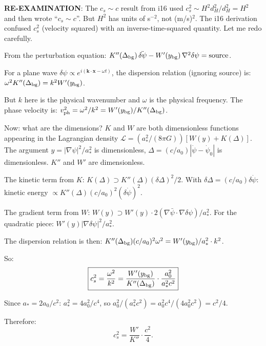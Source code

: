 \documentclass[11pt]{article}
\begin{document}
\begin{tcolorbox}[colback=red!5!white, colframe=red!70!black,
  title=\textbf{W4i17 TOP 5 FINDINGS --- EXISTENTIAL AUDIT: DUST BRANCH CLUSTERING}]
\begin{enumerate}
  \textbf{RE-EXAMINATION}: The $c_s \sim c$ result from i16
  used $c_s^2 \sim H^2 d_H^2 / d_H^2 = H^2$ and then wrote
  ``$c_s \sim c$''. But $H^2$ has units of s$^{-2}$, not
  (m/s)$^2$. The i16 derivation confused $c_s^2$ (velocity squared)
  with an inverse-time-squared quantity. Let me redo carefully.

  From the perturbation equation:
  $K''(\Delta_{\rm bg})\,\ddot{\delta\psi}
  - W'(y_{\rm bg})\,\nabla^2\delta\psi = \text{source}$.

  For a plane wave $\delta\psi \propto e^{i(\mathbf{k}\cdot\mathbf{x}
  - \omega t)}$, the dispersion relation (ignoring source) is:
  $\omega^2 K''(\Delta_{\rm bg}) = k^2 W'(y_{\rm bg})$.

  But $k$ here is the physical wavenumber and $\omega$ is the physical
  frequency. The phase velocity is:
  $v_{\rm ph}^2 = \omega^2/k^2 = W'(y_{\rm bg})/K''(\Delta_{\rm bg})$.

  Now: what are the dimensions? $K$ and $W$ are both dimensionless
  functions appearing in the Lagrangian density
  $\mathcal{L} = (a_*^2/(8\pi G))[W(y) + K(\Delta)]$.
  The argument $y = |\nabla\psi|^2/a_*^2$ is dimensionless,
  $\Delta = (c/a_0)|\dot\psi - \dot\psi_0|$ is dimensionless.
  $K''$ and $W'$ are dimensionless.

  The kinetic term from $K$: $K(\Delta) \supset K''(\Delta)(\delta\Delta)^2
  /2$. With $\delta\Delta = (c/a_0)\delta\dot\psi$:
  kinetic energy $\propto K''(\Delta)(c/a_0)^2(\delta\dot\psi)^2$.

  The gradient term from $W$: $W(y) \supset W'(y) \cdot 2(\nabla\bar\psi
  \cdot \nabla\delta\psi)/a_*^2$. For the quadratic piece:
  $W'(y) |\nabla\delta\psi|^2 / a_*^2$.

  The dispersion relation is then:
  $K''(\Delta_{\rm bg})(c/a_0)^2 \omega^2 = W'(y_{\rm bg})/a_*^2 \cdot k^2$.

  So:
  \begin{equation}
  \boxed{c_s^2 = \frac{\omega^2}{k^2} = \frac{W'(y_{\rm bg})}{K''(\Delta_{\rm bg})}
  \cdot \frac{a_0^2}{a_*^2 c^2}}
  \end{equation}

  Since $a_* = 2a_0/c^2$: $a_*^2 = 4a_0^2/c^4$, so
  $a_0^2/(a_*^2 c^2) = a_0^2 c^4/(4a_0^2 c^2) = c^2/4$.

  Therefore:
  \begin{equation}
  c_s^2 = \frac{W'}{K''} \cdot \frac{c^2}{4}.
  \end{equation}


\end{enumerate}
\end{tcolorbox}
\end{document}
